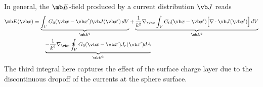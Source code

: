 \documentclass[letterpaper]{article}
\begin{document}
In general, the $\mb E$-field produced by a current distribution $\vb J$
reads
\begin{align*}
\mb E(\vb x)
&= \underbrace{\int_V G_0(\vb x-\vb x^\prime) \vb J(\vb x^\prime) \, dV}_{\mb E^1}
  +\underbrace{\frac{1}{k^2}\nabla_{\vb x}\int_V G_0(\vb x-\vb x^\prime)
               \Big[\nabla \cdot \vb J(\vb x^\prime)\Big]\,dV
              }_{\mb E^2}
\\
&\qquad
 \underbrace{
  -\frac{1}{k^2}\nabla_{\vb x}\oint_V G_0(\vb x-\vb x^\prime) J_r(\vb x^\prime)dA
            }_{\mb E^3}
\end{align*}
The third integral here captures the effect of the surface charge layer
due to the discontinuous dropoff of the currents at the sphere 
surface.
\end{document}

